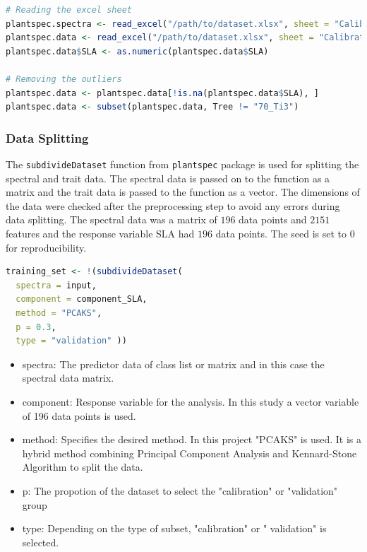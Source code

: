 \documentclass[12pt,a4paper]{report}
\begin{document}
\begin{lstlisting}[language=R, style=mystyle]
# Reading the excel sheet
plantspec.spectra <- read_excel("/path/to/dataset.xlsx", sheet = "Calibration set spectra")
plantspec.data <- read_excel("/path/to/dataset.xlsx", sheet = "Calibration set traits")
plantspec.data$SLA <- as.numeric(plantspec.data$SLA)

# Removing the outliers
plantspec.data <- plantspec.data[!is.na(plantspec.data$SLA), ]
plantspec.data <- subset(plantspec.data, Tree != "70_Ti3")
\end{lstlisting}

\subsubsection*{Data Splitting}
The \texttt{subdivideDataset} function from \texttt{plantspec} package is used for splitting the spectral and trait data. The spectral data is passed on to the function as a matrix and the trait data is passed to the function as a vector. The dimensions of the data were checked after the preprocessing step to avoid any errors during data splitting. The spectral data was a matrix of $196$ data points and $2151$ features and the response variable SLA had $196$ data points. The seed is set to $0$ for reproducibility. \\

\begin{lstlisting}[language=R, style=mystyle]
training_set <- !(subdivideDataset(
  spectra = input,
  component = component_SLA,
  method = "PCAKS", 
  p = 0.3, 
  type = "validation" ))
\end{lstlisting}


\begin{itemize}
    \item spectra: The predictor data of class list or matrix and in this case the spectral data matrix.
    \item component: Response variable for the analysis. In this study a vector variable of 196 data points is used.
    \item method: Specifies the desired method. In this project "PCAKS" is used. It is a hybrid method combining Principal Component Analysis and Kennard-Stone Algorithm to split the data.
    \item p: The propotion of the dataset to select the "calibration" or "validation" group
    \item type: Depending on the type of subset, "calibration" or " validation" is selected.
\end{itemize}
\end{document}
